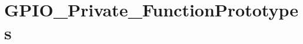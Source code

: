 \hypertarget{group___g_p_i_o___private___function_prototypes}{\section{G\-P\-I\-O\-\_\-\-Private\-\_\-\-Function\-Prototypes}
\label{group___g_p_i_o___private___function_prototypes}
}
